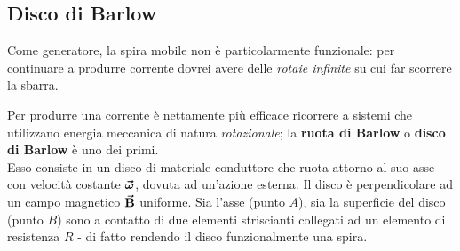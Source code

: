 \subsection{Disco di Barlow}
Come generatore, la spira mobile non è particolarmente funzionale: per continuare a produrre corrente dovrei avere delle \textit{rotaie infinite} su cui far scorrere la sbarra.

Per produrre una corrente è nettamente più efficace ricorrere a sistemi che utilizzano energia meccanica di natura \textit{rotazionale}; la \textbf{ruota di Barlow} o \textbf{disco di Barlow} è uno dei primi.\\
Esso consiste in un disco di materiale conduttore che ruota attorno al suo asse con velocità costante $\vb*{\va{\omega}}$, dovuta ad un'azione esterna. Il disco è perpendicolare ad un campo magnetico $\vb*{\va{B}}$ uniforme. Sia l'asse (punto $A$), sia la superficie del disco (punto $B$) sono a contatto di due elementi striscianti collegati ad un elemento di resistenza $R$ - di fatto rendendo il disco funzionalmente una spira.\\

